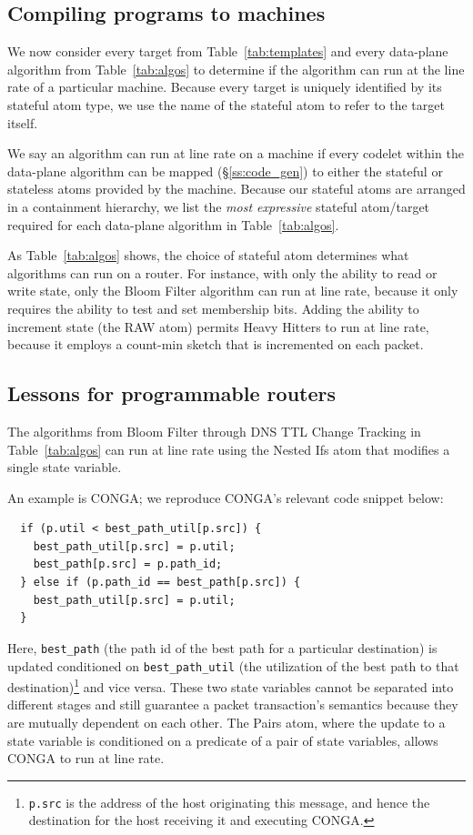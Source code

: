 \subsection{Compiling \pktlanguage programs to \absmachine machines}
\label{domino_ss:compiler}
We now consider every target from Table~\ref{tab:templates} and every
data-plane algorithm from Table~\ref{tab:algos} to determine if the algorithm
can run at the line rate of a particular \absmachine machine. Because every
target is uniquely identified by its stateful atom type, we use the name of the
stateful atom to refer to the target itself.

We say an algorithm can run at line rate on a \absmachine machine if every
codelet within the data-plane algorithm can be mapped (\S\ref{ss:code_gen}) to
either the stateful or stateless atoms provided by the \absmachine machine.
Because our stateful atoms are arranged in a containment hierarchy, we list the
\textit{most expressive} stateful atom/target required for each data-plane
algorithm in Table~\ref{tab:algos}.

As Table~\ref{tab:algos} shows, the choice of stateful atom determines what
algorithms can run on a router. For instance, with only the ability to read or
write state, only the Bloom Filter algorithm can run at line rate, because it
only requires the ability to test and set membership bits.  Adding the ability
to increment state (the RAW atom) permits Heavy Hitters to run at line rate,
because it employs a count-min sketch that is incremented on each packet.

\subsection{Lessons for programmable routers}
\label{ss:lessons}

 The algorithms from Bloom Filter through DNS TTL Change Tracking
in Table~\ref{tab:algos} can run at line rate using the Nested Ifs atom that
modifies a single state variable.

An example is CONGA; we reproduce CONGA's relevant code snippet below:
\begin{verbatim}
  if (p.util < best_path_util[p.src]) {
    best_path_util[p.src] = p.util;
    best_path[p.src] = p.path_id;
  } else if (p.path_id == best_path[p.src]) {
    best_path_util[p.src] = p.util;
  }
\end{verbatim}
Here, \texttt{best\_path} (the path id of the best path for a particular
destination) is updated conditioned on \texttt{best\_path\_util} (the
utilization of the best path to that destination)\footnote{{\tt p.src} is the
address of the host originating this message, and hence the destination for the
host receiving it and executing CONGA.} and vice versa. These two state
variables cannot be separated into different stages and still guarantee a
packet transaction's semantics because they are mutually dependent on each
other.  The Pairs atom, where the update to a state variable is conditioned on
a predicate of a pair of state variables, allows CONGA to run at line rate.

